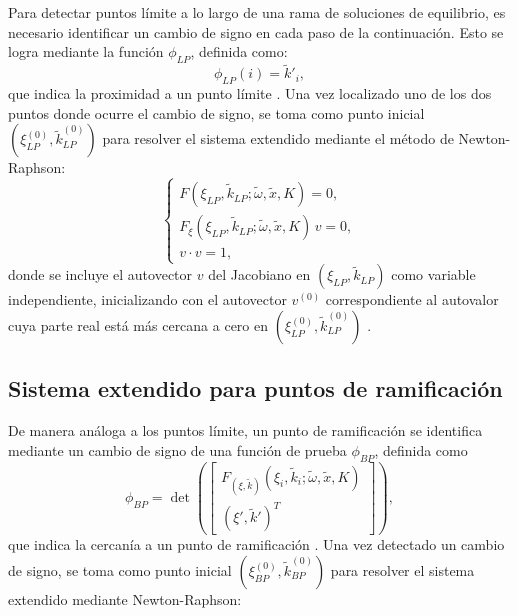 Para detectar puntos límite a lo largo de una rama de soluciones de equilibrio,
es necesario identificar un cambio de signo en cada paso de la continuación.
Esto se logra mediante la función $ \phi_{LP} $, definida como:
\begin{equation}
    \phi_{LP}(i) = \tilde{k}'_i,
    \label{LPtest}
\end{equation}
que indica la proximidad a un punto límite \cite{Meijer2011}. Una vez localizado uno de los dos
puntos donde ocurre el cambio de signo, se toma como punto inicial $ ( \xi_{LP}^{(0)},
    \tilde{k}_{LP}^{(0)} ) $ para resolver el sistema extendido mediante el método de Newton-Raphson:
\begin{equation}
    \begin{cases}
        F(\xi_{LP}, \tilde{k}_{LP}; \tilde{\omega}, \tilde{x}, K) = 0,            \\[2mm]
        F_{\xi}(\xi_{LP}, \tilde{k}_{LP}; \tilde{\omega}, \tilde{x}, K) \, v = 0, \\[1mm]
        v \cdot v = 1,
    \end{cases}
    \label{eq:System_lp}
\end{equation}
donde se incluye el autovector $v$ del Jacobiano en $ ( \xi_{LP}, \tilde{k}_{LP} ) $
como variable independiente, inicializando con el autovector $v^{(0)}$ correspondiente
al autovalor cuya parte real está más cercana a cero en $ ( \xi_{LP}^{(0)}, \tilde{k}_{LP}^{(0)} ) $ \cite{Meijer2011}.

\subsection{Sistema extendido para puntos de ramificación}

De manera análoga a los puntos límite, un punto de ramificación se identifica mediante
un cambio de signo de una función de prueba $ \phi_{BP} $, definida como
\begin{equation}
    \phi_{BP} = \det \left( \begin{bmatrix} F_{(\xi, \tilde{k})}(\xi_i, \tilde{k}_i; \tilde{\omega}, \tilde{x}, K) \\
            ( \xi' , \tilde{k}' )^{T}
        \end{bmatrix} \right),
    \label{BPtest}
\end{equation}
que indica la cercanía a un punto de ramificación \cite{Meijer2011}. Una vez detectado un cambio de
signo, se toma como punto inicial $ ( \xi_{BP}^{(0)}, \tilde{k}_{BP}^{(0)} ) $ para
resolver el sistema extendido mediante Newton-Raphson:


